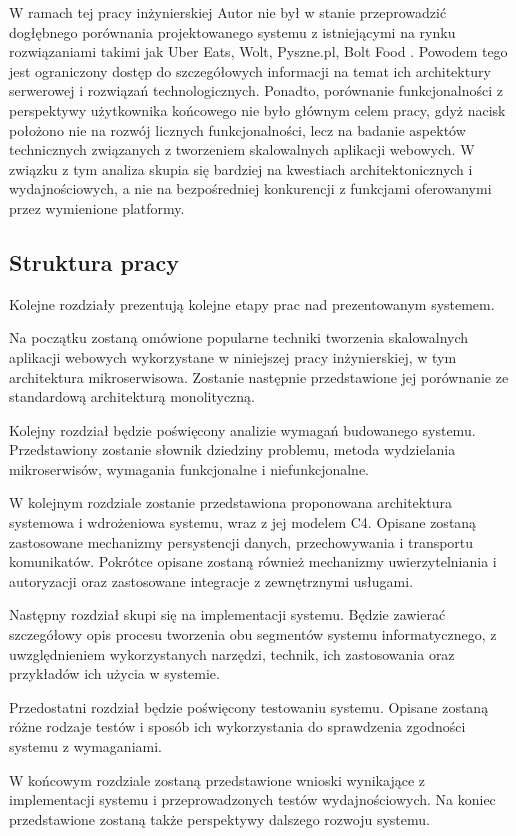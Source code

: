 W ramach tej pracy inżynierskiej Autor nie był w stanie przeprowadzić dogłębnego porównania projektowanego systemu z istniejącymi na rynku rozwiązaniami takimi jak Uber Eats, Wolt, Pyszne.pl, Bolt Food \cite{fooddeliveryapps}. Powodem tego jest ograniczony dostęp do szczegółowych informacji na temat ich architektury serwerowej i rozwiązań technologicznych. Ponadto, porównanie funkcjonalności z perspektywy użytkownika końcowego nie było głównym celem pracy, gdyż nacisk położono nie na rozwój licznych funkcjonalności, lecz na badanie aspektów technicznych związanych z tworzeniem skalowalnych aplikacji webowych. W związku z tym analiza skupia się bardziej na kwestiach architektonicznych i wydajnościowych, a nie na bezpośredniej konkurencji z funkcjami oferowanymi przez wymienione platformy.


\subsection{Struktura pracy}

Kolejne rozdziały prezentują kolejne etapy prac nad prezentowanym systemem.

Na początku zostaną omówione popularne techniki tworzenia skalowalnych aplikacji webowych wykorzystane w niniejszej pracy inżynierskiej, w tym architektura mikroserwisowa. Zostanie następnie przedstawione jej porównanie ze standardową architekturą monolityczną.

Kolejny rozdział będzie poświęcony analizie wymagań budowanego systemu. Przedstawiony zostanie słownik dziedziny problemu, metoda wydzielania mikroserwisów, wymagania funkcjonalne i niefunkcjonalne.

W kolejnym rozdziale zostanie przedstawiona proponowana architektura systemowa i wdrożeniowa systemu, wraz z jej modelem C4. Opisane zostaną zastosowane mechanizmy persystencji danych, przechowywania i transportu komunikatów. Pokrótce opisane zostaną również mechanizmy uwierzytelniania i autoryzacji oraz zastosowane integracje z zewnętrznymi usługami.

Następny rozdział skupi się na implementacji systemu. Będzie zawierać szczegółowy opis procesu tworzenia obu segmentów systemu informatycznego, z uwzględnieniem wykorzystanych narzędzi, technik, ich zastosowania oraz przykładów ich użycia w systemie.

Przedostatni rozdział będzie poświęcony testowaniu systemu. Opisane zostaną różne rodzaje testów i sposób ich wykorzystania do sprawdzenia zgodności systemu z wymaganiami.

W końcowym rozdziale zostaną przedstawione wnioski wynikające z implementacji systemu i przeprowadzonych testów wydajnościowych. Na koniec przedstawione zostaną także perspektywy dalszego rozwoju systemu.